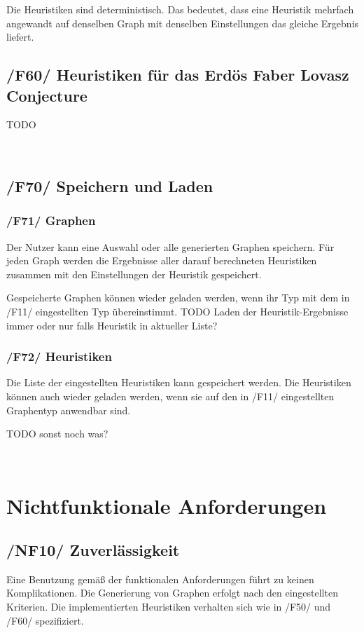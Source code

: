 \documentclass{article}
\begin{document}
	Die Heuristiken sind deterministisch. Das bedeutet, dass eine Heuristik mehrfach angewandt auf denselben Graph mit denselben Einstellungen das gleiche Ergebnis liefert.
	
	\subsection*{/F60/ Heuristiken für das Erdös Faber Lovasz Conjecture} \label{f60} 
	
	TODO
	
	~\newpage
	\subsection*{/F70/ Speichern und Laden} \label{f70} 
	
	\subsubsection*{/F71/ Graphen} \label{f71} 
	Der Nutzer kann eine Auswahl oder alle generierten Graphen speichern. Für jeden Graph werden die Ergebnisse aller darauf berechneten Heuristiken zusammen mit den Einstellungen der Heuristik gespeichert.
	
	Gespeicherte Graphen können wieder geladen werden, wenn ihr Typ mit dem in /F11/ eingestellten Typ übereinstimmt.
	TODO Laden der Heuristik-Ergebnisse immer oder nur falls Heuristik in aktueller Liste?
	
	\subsubsection*{/F72/ Heuristiken} \label{f72} 
	Die Liste der eingestellten Heuristiken kann gespeichert werden. Die Heuristiken können auch wieder geladen werden, wenn sie auf den in /F11/ eingestellten Graphentyp anwendbar sind.
	
	TODO sonst noch was?
	
	~\newpage
	\section{Nichtfunktionale Anforderungen}
	\subsection*{/NF10/ Zuverlässigkeit} \label{nf10} 
	Eine Benutzung gemäß der funktionalen Anforderungen führt zu keinen Komplikationen. Die Generierung von Graphen erfolgt nach den eingestellten Kriterien. Die implementierten Heuristiken verhalten sich wie in /F50/ und /F60/ spezifiziert.
	
\end{document}
